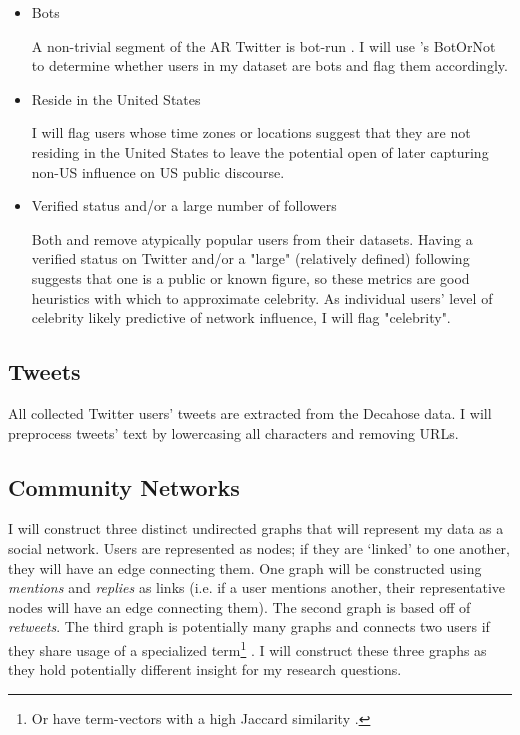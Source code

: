 \documentclass[acmlarge, screen, authorversion]{acmart}
\begin{document}
\begin{itemize}
	\item Bots

	      A non-trivial segment of the AR Twitter is bot-run \cite{bergerAltrightTwitterCensus2018}. I will use \citet{davisBotOrNotSystemEvaluate2016}'s BotOrNot to determine whether users in my dataset are bots and flag them accordingly.

	\item Reside in the United States

	      I will flag users whose time zones or locations suggest that they are not residing in the United States to leave the potential open of later capturing non-US influence on US public discourse.

	\item Verified status and/or a large number of followers

	      Both \citet{bergerAltrightTwitterCensus2018} and
	      \citet{alizadehPsychologyMoralityPolitical2019} remove atypically popular users from their datasets. Having a verified status on Twitter and/or a
	      "large" (relatively defined) following suggests that one is a public or
	      known figure, so these metrics are good heuristics with which to
	      approximate celebrity. As individual users' level of celebrity likely
	      predictive of network influence, I will flag "celebrity".

\end{itemize}

\subsection{Tweets}

All collected Twitter users' tweets are extracted from the Decahose data. I will preprocess tweets' text by lowercasing all characters and removing URLs.

\subsection{Community Networks}

I will construct three distinct undirected graphs that will represent my data as a
social network. Users are represented as nodes; if they are `linked' to one
another, they will have an edge connecting them. One graph will be constructed
using \textit{mentions} and \textit{replies} as links (i.e. if a user mentions
another, their representative nodes will have an edge connecting them). The
second graph is based off of \textit{retweets}. The third graph is potentially
many graphs and connects two users if they share usage of a specialized
term\footnote{Or have term-vectors with a high Jaccard similarity
\cite{niwattanakulUsingJaccardCoefficient2013}.} . I will construct these three
graphs as they hold potentially different insight for my research questions.
\end{document}
